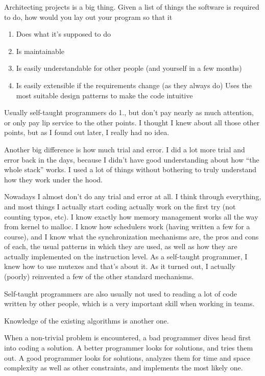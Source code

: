 \documentclass{article}
\begin{document}
Architecting projects is a big thing. Given a list of things the
software is required to do, how would you lay out your program so that
it
\begin{enumerate}
    \item Does what it's supposed to do
    \item Is maintainable
    \item Is easily understandable for other people (and yourself in a few
        months)
    \item Is easily extensible if the requirements change (as they always do)
        Uses the most suitable design patterns to make the code intuitive
\end{enumerate}
Usually self-taught programmers do 1., but don't pay nearly as much
attention, or only pay lip service to the other points. I thought I
knew about all those other points, but as I found out later, I really
had no idea.

Another big difference is how much trial and error. I did a lot more
trial and error back in the days, because I didn't have good
understanding about how ``the whole stack'' works. I used a lot of
things without bothering to truly understand how they work under the
hood.

Nowadays I almost don't do any trial and error at all. I think through
everything, and most things I actually start coding actually work on
the first try (not counting typos, etc). I know exactly how memory
management works all the way from kernel to malloc. I know how
schedulers work (having written a few for a course), and I know what
the synchronization mechanisms are, the pros and cons of each, the
usual patterns in which they are used, as well as how they are
actually implemented on the instruction level. As a self-taught
programmer, I knew how to use mutexes and that's about it. As it
turned out, I actually (poorly) reinvented a few of the other standard
mechanisms.

Self-taught programmers are also usually not used to reading a lot of
code written by other people, which is a very important skill when
working in teams.

Knowledge of the existing algorithms is another one.

When a non-trivial problem is encountered, a bad programmer dives head
first into coding a solution. A better programmer looks for solutions,
and tries them out. A good programmer looks for solutions, analyzes
them for time and space complexity as well as other constraints, and
implements the most likely one.
\end{document}
